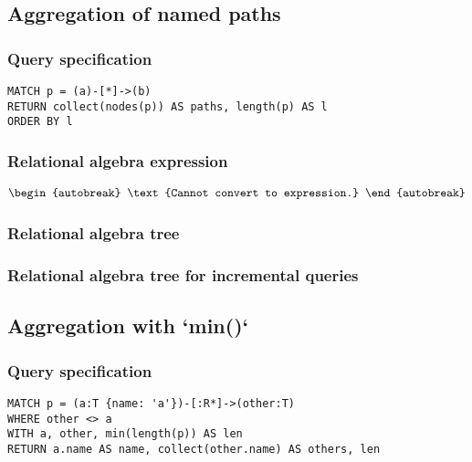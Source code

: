 \subsection{Aggregation of named paths}

\subsubsection*{Query specification}

\begin{lstlisting}
MATCH p = (a)-[*]->(b)
RETURN collect(nodes(p)) AS paths, length(p) AS l
ORDER BY l
\end{lstlisting}

\subsubsection*{Relational algebra expression}

\begin{align*}
\begin{autobreak}
\text{Cannot convert to expression.}
\end{autobreak}
\end{align*}

\subsubsection*{Relational algebra tree}


\subsubsection*{Relational algebra tree for incremental queries}


\subsection{Aggregation with `min()`}

\subsubsection*{Query specification}

\begin{lstlisting}
MATCH p = (a:T {name: 'a'})-[:R*]->(other:T)
WHERE other <> a
WITH a, other, min(length(p)) AS len
RETURN a.name AS name, collect(other.name) AS others, len
\end{lstlisting}

